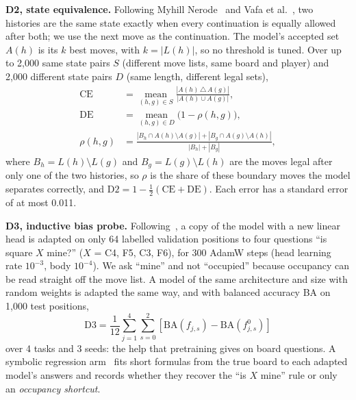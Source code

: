 \documentclass[journal]{IEEEtran}
\begin{document}
\textbf{D2, state equivalence.} Following Myhill Nerode~\cite{nerode1958linear} and Vafa et
al.~\cite{vafa2024evaluating}, two histories are the same state exactly when every continuation is equally allowed
after both; we use the next move as the continuation. The model's accepted set $A(h)$ is its $k$ best moves, with
$k=|L(h)|$, so no threshold is tuned. Over up to 2,000 same state pairs $S$ (different move lists, same board and
player) and 2,000 different state pairs $D$ (same length, different legal sets),
\begin{align}
  \mathrm{CE}&=\operatorname*{mean}_{(h,g)\in S}\frac{|A(h)\,\triangle\,A(g)|}{|A(h)\cup A(g)|},\\
  \mathrm{DE}&=\operatorname*{mean}_{(h,g)\in D}\big(1-\rho(h,g)\big),\\
  \rho(h,g)&=\frac{|B_h\cap A(h)\setminus A(g)|+|B_g\cap A(g)\setminus A(h)|}{|B_h|+|B_g|},
\end{align}
where $B_h=L(h)\setminus L(g)$ and $B_g=L(g)\setminus L(h)$ are the moves legal after only one of the two
histories, so $\rho$ is the share of these boundary moves the model separates correctly, and
$\mathrm{D2}=1-\tfrac{1}{2}(\mathrm{CE}+\mathrm{DE})$. Each error has a standard error of at most
0.011.

\textbf{D3, inductive bias probe.} Following~\cite{vafa2025inductive}, a copy of the model with a new linear head is
adapted on only 64 labelled validation positions to four questions ``is square $X$ mine?'' ($X$ = C4, F5, C3, F6),
for 300 AdamW steps (head learning rate $10^{-3}$, body $10^{-4}$). We ask ``mine'' and not ``occupied'' because
occupancy can be read straight off the move list. A model of the same architecture and size with random weights is
adapted the same way, and with balanced accuracy BA on 1,000 test positions,
\begin{equation}
  \mathrm{D3}=\frac{1}{12}\sum_{j=1}^{4}\sum_{s=0}^{2}\left[\mathrm{BA}(f_{j,s})-\mathrm{BA}(f^{0}_{j,s})\right]
\end{equation}
over 4 tasks and 3 seeds: the help that pretraining gives on board questions. A symbolic regression
arm~\cite{cranmer2023pysr} fits short formulas from the true board to each adapted model's answers and records
whether they recover the ``is $X$ mine'' rule or only an \emph{occupancy shortcut}.
\end{document}

